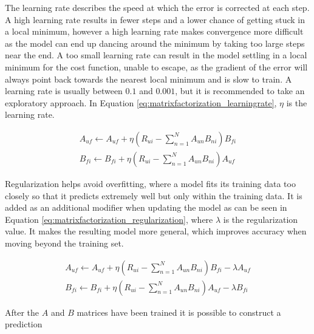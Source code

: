 The learning rate describes the speed at which the error is corrected at each step. A high learning rate results in fewer steps and a lower chance of getting stuck in a local minimum, however a high learning rate makes convergence more difficult as the model can end up dancing around the minimum by taking too large steps near the end. A too small learning rate can result in the model settling in a local minimum for the cost function, unable to escape, as the gradient of the error will always point back towards the nearest local minimum and is slow to train. A learning rate is usually between $0.1$ and $0.001$, but it is recommended to take an exploratory approach. In Equation \ref{eq:matrixfactorization_learningrate}, $\eta$ is the learning rate.

\begin{equation}\label{eq:matrixfactorization_learningrate}
	\begin{split}
	A_{uf}\leftarrow A_{uf} + \eta(R_{ui}-\sum_{n=1}^{N}A_{un}B_{ni})B_{fi}
	\\
	B_{fi}\leftarrow B_{fi} + \eta(R_{ui}-\sum_{n=1}^{N}A_{un}B_{ni})A_{uf}
	\end{split}
\end{equation}

Regularization helps avoid overfitting, where a model fits its training data too closely so that it predicts extremely well but only within the training data. It is added as an additional modifier when updating the model as can be seen in Equation \ref{eq:matrixfactorization_regularization}, where $\lambda$ is the regularization value. It makes the resulting model more general, which improves accuracy when moving beyond the training set.

\begin{equation}\label{eq:matrixfactorization_regularization}
	\begin{split}
	A_{uf}\leftarrow A_{uf} + \eta(R_{ui}-\sum_{n=1}^{N}A_{un}B_{ni})B_{fi}-\lambda A_{uf}
	\\
	B_{fi}\leftarrow B_{fi} + \eta(R_{ui}-\sum_{n=1}^{N}A_{un}B_{ni})A_{uf} -\lambda B_{fi}
	\end{split}
\end{equation}

After the $A$ and $B$ matrices have been trained it is possible to construct a prediction 

